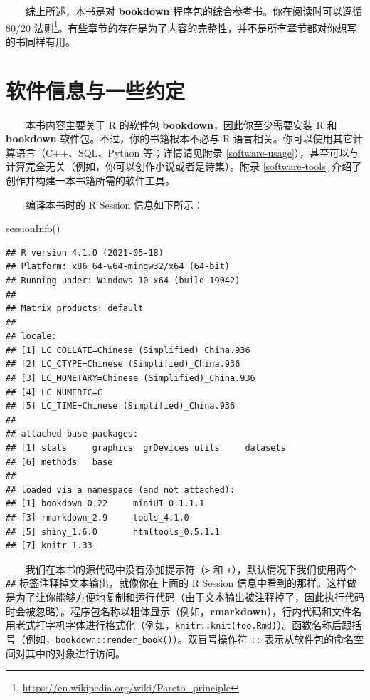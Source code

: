 \documentclass[
  12pt,
]{krantz}
\newenvironment{Shaded}{\begin{snugshade}}{\end{snugshade}}
\newcommand{\FunctionTok}[1]{\textcolor[rgb]{0.00,0.00,0.00}{#1}}
\newcommand{\NormalTok}[1]{#1}
\renewcommand{\href}[2]{#2\footnote{\url{#1}}}
\theoremstyle{definition}
\theoremstyle{definition}
\theoremstyle{definition}
\theoremstyle{definition}
\theoremstyle{remark}
\begin{document}
  综上所述，本书是对 \textbf{bookdown} 程序包的综合参考书。你在阅读时可以遵循 \href{https://en.wikipedia.org/wiki/Pareto_principle}{80/20 法则}。有些章节的存在是为了内容的完整性，并不是所有章节都对你想写的书同样有用。

\hypertarget{ux8f6fux4ef6ux4fe1ux606fux4e0eux4e00ux4e9bux7ea6ux5b9a}{%
\section*{软件信息与一些约定}\label{ux8f6fux4ef6ux4fe1ux606fux4e0eux4e00ux4e9bux7ea6ux5b9a}}


  本书内容主要关于 R 的软件包 \textbf{bookdown}，因此你至少需要安装 R 和 \textbf{bookdown} 软件包。不过，你的书籍根本不必与 R 语言相关。你可以使用其它计算语言（C++、SQL、Python 等；详情请见附录 \ref{software-usage}），甚至可以与计算完全无关（例如，你可以创作小说或者是诗集）。附录 \ref{software-tools} 介绍了创作并构建一本书籍所需的软件工具。

  编译本书时的 R Session 信息如下所示：

\begin{Shaded}
\begin{Highlighting}[]
\FunctionTok{sessionInfo}\NormalTok{()}
\end{Highlighting}
\end{Shaded}

\begin{verbatim}
## R version 4.1.0 (2021-05-18)
## Platform: x86_64-w64-mingw32/x64 (64-bit)
## Running under: Windows 10 x64 (build 19042)
## 
## Matrix products: default
## 
## locale:
## [1] LC_COLLATE=Chinese (Simplified)_China.936 
## [2] LC_CTYPE=Chinese (Simplified)_China.936   
## [3] LC_MONETARY=Chinese (Simplified)_China.936
## [4] LC_NUMERIC=C                              
## [5] LC_TIME=Chinese (Simplified)_China.936    
## 
## attached base packages:
## [1] stats     graphics  grDevices utils     datasets 
## [6] methods   base     
## 
## loaded via a namespace (and not attached):
## [1] bookdown_0.22     miniUI_0.1.1.1   
## [3] rmarkdown_2.9     tools_4.1.0      
## [5] shiny_1.6.0       htmltools_0.5.1.1
## [7] knitr_1.33
\end{verbatim}

  我们在本书的源代码中没有添加提示符（\texttt{\textgreater{}} 和 \texttt{+}），默认情况下我们使用两个 \texttt{\#\#} 标签注释掉文本输出，就像你在上面的 R Session 信息中看到的那样。这样做是为了让你能够方便地复制和运行代码（由于文本输出被注释掉了，因此执行代码时会被忽略）。程序包名称以粗体显示（例如，\textbf{rmarkdown}），行内代码和文件名用老式打字机字体进行格式化（例如，\texttt{knitr::knit(\textquotesingle{}foo.Rmd\textquotesingle{})}）。函数名称后跟括号（例如，\texttt{bookdown::render\_book()}）。双冒号操作符 \texttt{::} 表示从软件包的命名空间对其中的对象进行访问。
\end{document}
